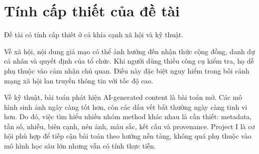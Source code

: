 \section{Tính cấp thiết của đề tài}
Đề tài có tính cấp thiết ở cả khía cạnh xã hội và kỹ thuật.

Về xã hội, nội dung giả mạo có thể ảnh hưởng đến nhận thức cộng đồng, danh dự cá nhân và quyết định của tổ chức. Khi người dùng thiếu công cụ kiểm tra, họ dễ phụ thuộc vào cảm nhận chủ quan. Điều này đặc biệt nguy hiểm trong bối cảnh mạng xã hội lan truyền thông tin với tốc độ cao.

Về kỹ thuật, bài toán phát hiện AI-generated content là bài toán mở. Các mô hình sinh ảnh ngày càng tốt hơn, còn các dấu vết bất thường ngày càng tinh vi hơn. Do đó, việc tìm hiểu nhiều nhóm method khác nhau là cần thiết: metadata, tần số, nhiễu, biên cạnh, nén ảnh, màu sắc, kết cấu và provenance. Project I là cơ hội phù hợp để tiếp cận bài toán theo hướng nền tảng, không quá phụ thuộc vào mô hình học sâu lớn nhưng vẫn có tính thực tiễn.
